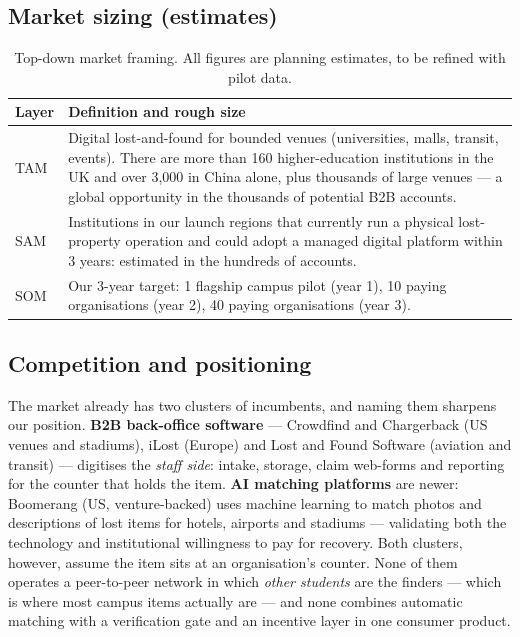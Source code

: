 \documentclass[11pt,a4paper]{article}
\begin{document}
\subsection{Market sizing (estimates)}

\begin{table}[H]
\centering
\small
\renewcommand{\arraystretch}{1.35}
\begin{tabularx}{\textwidth}{l Y}
\toprule
\textbf{Layer} & \textbf{Definition and rough size} \\
\midrule
TAM & Digital lost-and-found for bounded venues (universities, malls, transit, events).
There are more than 160 higher-education institutions in the UK and over 3{,}000 in China
alone, plus thousands of large venues --- a global opportunity in the thousands of
potential B2B accounts. \\
SAM & Institutions in our launch regions that currently run a physical lost-property
operation and could adopt a managed digital platform within 3 years: estimated in the
hundreds of accounts. \\
SOM & Our 3-year target: 1 flagship campus pilot (year 1), 10 paying organisations
(year 2), 40 paying organisations (year 3). \\
\bottomrule
\end{tabularx}
\caption{Top-down market framing. All figures are planning estimates, to be refined with
pilot data.}
\end{table}

\subsection{Competition and positioning}

The market already has two clusters of incumbents, and naming them sharpens our position.
\textbf{B2B back-office software} --- Crowdfind and Chargerback (US venues and stadiums),
iLost (Europe) and Lost and Found Software (aviation and transit) --- digitises the
\emph{staff side}: intake, storage, claim web-forms and reporting for the counter that
holds the item. \textbf{AI matching platforms} are newer: Boomerang (US, venture-backed)
uses machine learning to match photos and descriptions of lost items for hotels, airports
and stadiums --- validating both the technology and institutional willingness to pay for
recovery. Both clusters, however, assume the item sits at an organisation's counter. None
of them operates a peer-to-peer network in which \emph{other students} are the finders ---
which is where most campus items actually are --- and none combines automatic matching
with a verification gate and an incentive layer in one consumer product.
\end{document}
